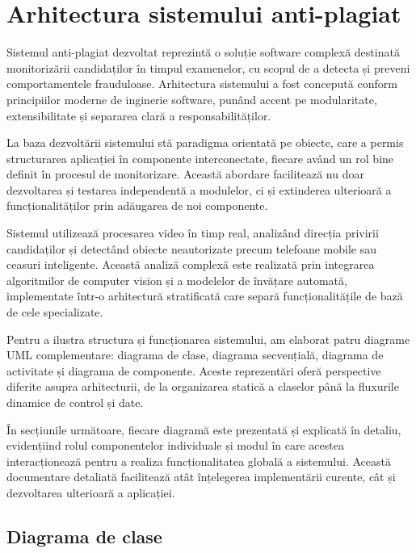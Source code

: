 \documentclass[12pt,a4paper]{article}
\begin{document}
\section{Arhitectura sistemului anti-plagiat}

Sistemul anti-plagiat dezvoltat reprezintă o soluție software complexă destinată monitorizării candidaților în timpul examenelor, cu scopul de a detecta și preveni comportamentele frauduloase. Arhitectura sistemului a fost concepută conform principiilor moderne de inginerie software, punând accent pe modularitate, extensibilitate și separarea clară a responsabilităților.

La baza dezvoltării sistemului stă paradigma orientată pe obiecte, care a permis structurarea aplicației în componente interconectate, fiecare având un rol bine definit în procesul de monitorizare. Această abordare facilitează nu doar dezvoltarea și testarea independentă a modulelor, ci și extinderea ulterioară a funcționalităților prin adăugarea de noi componente.

Sistemul utilizează procesarea video în timp real, analizând direcția privirii candidaților și detectând obiecte neautorizate precum telefoane mobile sau ceasuri inteligente. Această analiză complexă este realizată prin integrarea algoritmilor de computer vision și a modelelor de învățare automată, implementate într-o arhitectură stratificată care separă funcționalitățile de bază de cele specializate.

Pentru a ilustra structura și funcționarea sistemului, am elaborat patru diagrame UML complementare: diagrama de clase, diagrama secvențială, diagrama de activitate și diagrama de componente. Aceste reprezentări oferă perspective diferite asupra arhitecturii, de la organizarea statică a claselor până la fluxurile dinamice de control și date.

În secțiunile următoare, fiecare diagramă este prezentată și explicată în detaliu, evidențiind rolul componentelor individuale și modul în care acestea interacționează pentru a realiza funcționalitatea globală a sistemului. Această documentare detaliată facilitează atât înțelegerea implementării curente, cât și dezvoltarea ulterioară a aplicației.
\subsection{Diagrama de clase}
\end{document}
